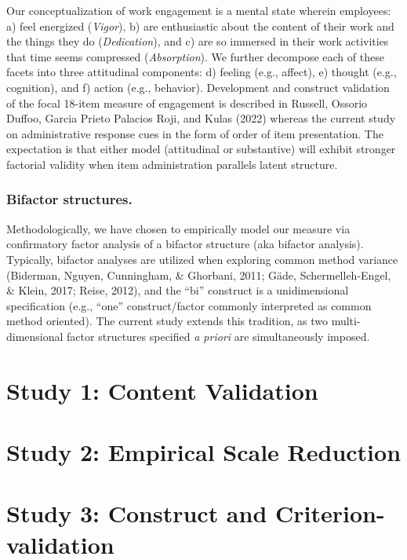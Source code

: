 \documentclass[
  man]{apa7}
\begin{document}
Our conceptualization of work engagement is a mental state wherein employees: a) feel energized (\emph{Vigor}), b) are enthusiastic about the content of their work and the things they do (\emph{Dedication}), and c) are so immersed in their work activities that time seems compressed (\emph{Absorption}). We further decompose each of these facets into three attitudinal components: d) feeling (e.g., affect), e) thought (e.g., cognition), and f) action (e.g., behavior). Development and construct validation of the focal 18-item measure of engagement is described in Russell, Ossorio Duffoo, Garcia Prieto Palacios Roji, and Kulas (2022) whereas the current study on administrative response cues in the form of order of item presentation. The expectation is that either model (attitudinal or substantive) will exhibit stronger factorial validity when item administration parallels latent structure.

\hypertarget{bifactor-structures.}{%
\subsubsection{Bifactor structures.}\label{bifactor-structures.}}

Methodologically, we have chosen to empirically model our measure via confirmatory factor analysis of a bifactor structure (aka bifactor analysis). Typically, bifactor analyses are utilized when exploring common method variance (Biderman, Nguyen, Cunningham, \& Ghorbani, 2011; Gäde, Schermelleh-Engel, \& Klein, 2017; Reise, 2012), and the ``bi'' construct is a unidimensional specification (e.g., ``one'' construct/factor commonly interpreted as common method oriented). The current study extends this tradition, as two multi-dimensional factor structures specified \emph{a priori} are simultaneously imposed.

\hypertarget{study-1-content-validation}{%
\section{Study 1: Content Validation}\label{study-1-content-validation}}

\hypertarget{study-2-empirical-scale-reduction}{%
\section{Study 2: Empirical Scale Reduction}\label{study-2-empirical-scale-reduction}}

\hypertarget{study-3-construct-and-criterion-validation}{%
\section{Study 3: Construct and Criterion-validation}\label{study-3-construct-and-criterion-validation}}
\end{document}
